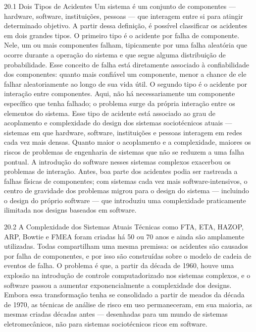 20.1 Dois Tipos de Acidentes Um sistema é um conjunto de componentes — hardware, software, instituições, pessoas — que interagem entre si para atingir determinado objetivo. A partir dessa definição, é possível classificar os acidentes em dois grandes tipos. O primeiro tipo é o acidente por falha de componente. Nele, um ou mais componentes falham, tipicamente por uma falha aleatória que ocorre durante a operação do sistema e que segue alguma distribuição de probabilidade. Esse conceito de falha está diretamente associado à confiabilidade dos componentes: quanto mais confiável um componente, menor a chance de ele falhar aleatoriamente ao longo de sua vida útil. O segundo tipo é o acidente por interação entre componentes. Aqui, não há necessariamente um componente específico que tenha falhado; o problema surge da própria interação entre os elementos do sistema. Esse tipo de acidente está associado ao grau de acoplamento e complexidade do design dos sistemas sociotécnicos atuais — sistemas em que hardware, software, instituições e pessoas interagem em redes cada vez mais densas. Quanto maior o acoplamento e a complexidade, maiores os riscos de problemas de engenharia de sistemas que não se reduzem a uma falha pontual. A introdução do software nesses sistemas complexos exacerbou os problemas de interação. Antes, boa parte dos acidentes podia ser rastreada a falhas físicas de componentes; com sistemas cada vez mais software-intensivos, o centro de gravidade dos problemas migrou para o design do sistema — incluindo o design do próprio software — que introduziu uma complexidade praticamente ilimitada nos designs baseados em software.

20.2 A Complexidade dos Sistemas Atuais Técnicas como FTA, ETA, HAZOP, ARP, Bowtie e FMEA foram criadas há 50 ou 70 anos e ainda são amplamente utilizadas. Todas compartilham uma mesma premissa: os acidentes são causados por falha de componentes, e por isso são construídas sobre o modelo de cadeia de eventos de falha. O problema é que, a partir da década de 1960, houve uma explosão na introdução de controle computadorizado nos sistemas complexos, e o software passou a aumentar exponencialmente a complexidade dos designs. Embora essa transformação tenha se consolidado a partir de meados da década de 1970, as técnicas de análise de risco em uso permaneceram, em sua maioria, as mesmas criadas décadas antes — desenhadas para um mundo de sistemas eletromecânicos, não para sistemas sociotécnicos ricos em software.

